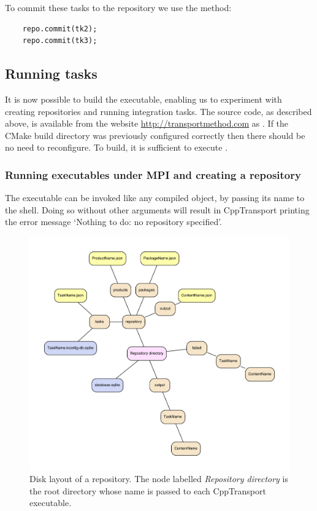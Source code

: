 \documentclass[11pt,a4paper]{article}
\renewcommand{\texttt}[1]{{\ttfamily\fontseries{l}\selectfont{#1}}}
\newcommand{\packagefont}{\sffamily}
\newcommand{\CppTransport}{{\packagefont CppTransport}}
\newcommand{\CMake}{{\packagefont CMake}}
\newcommand{\file}[1]{\texttt{{#1}}}
\begin{document}
To commit these tasks to the repository we use the
\texttt{commit()} method:
\begin{verbatim}
    repo.commit(tk2);
    repo.commit(tk3);    
\end{verbatim}

\subsection{Running tasks}
It is now possible to build the executable, enabling us to experiment
with creating repositories and running integration tasks.
The source code, as described above, is available from the
website \url{http://transportmethod.com} as
\file{dquad\_A.cpp}.
If the {\CMake} build directory was previously
configured correctly then there should be no need
to reconfigure.
To build, it is sufficient to execute
\texttt{make}.

\subsubsection{Running executables under MPI and creating a repository}
The \file{dquad} executable can be invoked like any compiled object, by
passing its name to the shell.
Doing so without other arguments
will result in {\CppTransport} printing the error message
`Nothing to do: no repository specified'.
\begin{figure}
    \begin{center}
        \includegraphics[scale=0.7]{Diagrams/repo}   
    \end{center}
    \caption{\label{fig:repo-layout}Disk layout of a repository. The node
    labelled \emph{Repository directory} is the root directory whose name
    is passed to each {\CppTransport} executable.}
\end{figure}
\end{document}
